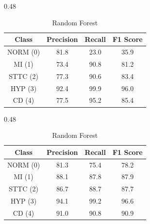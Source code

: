 \begin{table}[H]
    \centering
    \caption{\textbf{Protocol B} class–wise performance metrics across models.}
    \label{tab:cv_classwise_ablation}

    \begin{subtable}[t]{0.48\textwidth}
        \centering
        \caption{KNN}
        \label{tab:cv_knn_ablation}
        \begin{tabular}{cccc}
            \toprule
            Class & Precision & Recall & F1 Score \\
            \midrule
            NORM (0) & 81.8 & 23.0 & 35.9 \\
            MI   (1) & 73.4 & 90.8 & 81.2 \\
            STTC (2) & 77.3 & 90.6 & 83.4 \\
            HYP  (3) & 92.4 & 99.9 & 96.0 \\
            CD   (4) & 77.5 & 95.2 & 85.4 \\
            \bottomrule
        \end{tabular}
    \end{subtable}
    \hfill
    \begin{subtable}[t]{0.48\textwidth}
        \centering
        \caption{Random Forest}
        \label{tab:cv_rf_ablation}
        \begin{tabular}{cccc}
            \toprule
            Class & Precision & Recall & F1 Score \\
            \midrule
            NORM (0) & 81.3 & 75.4 & 78.2 \\
            MI   (1) & 88.1 & 87.8 & 87.9 \\
            STTC (2) & 86.7 & 88.7 & 87.7 \\
            HYP  (3) & 94.1 & 99.2 & 96.6 \\
            CD   (4) & 91.0 & 90.8 & 90.9 \\
            \bottomrule
        \end{tabular}
    \end{subtable}

    \bigskip


\end{table}
